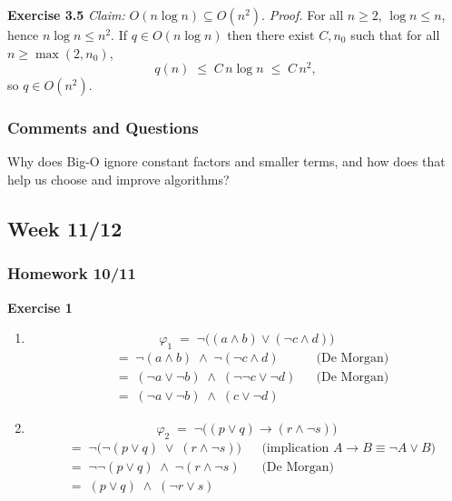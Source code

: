 \documentclass{article}
\theoremstyle{theorem}
\theoremstyle{definition}
\theoremstyle{remark}
\begin{document}
\textbf{Exercise 3.5}  
\emph{Claim:} $O(n\log n)\subseteq O(n^2)$.  
\noindent\emph{Proof.}  
For all $n\ge2$, $\log n\le n$, hence $n\log n\le n^2$. If $q\in O(n\log n)$ then there exist $C,n_0$ such that for all $n\ge\max(2,n_0)$,
\[
  q(n)\;\le\;C\,n\log n\;\le\;C\,n^2,
\]
so $q\in O(n^2)$.


\subsubsection*{Comments and Questions}

Why does Big-O ignore constant factors and smaller terms, and how does that help us choose and improve algorithms?

\subsection{Week 11/12}


\subsubsection*{Homework 10/11}

\textbf{Exercise 1}

\begin{enumerate}
  \item 
    \[
      \varphi_{1} \;=\;\neg\bigl((a\wedge b)\lor(\neg c\wedge d)\bigr)
    \]
    \begin{align*}
      &=\;\neg(a\wedge b)\;\land\;\neg(\neg c\wedge d) 
        &&\text{(De Morgan)}\\
      &=\;(\neg a\lor\neg b)\;\land\;(\neg\neg c\lor\neg d)
        &&\text{(De Morgan)}\\
      &=\;(\neg a\lor\neg b)\;\land\;(c\lor\neg d)
    \end{align*}

  \item 
    \[
      \varphi_{2} \;=\;\neg\bigl((p\lor q)\to(r\wedge\neg s)\bigr)
    \]
    \begin{align*}
      &=\;\neg\bigl(\neg(p\lor q)\;\lor\;(r\wedge\neg s)\bigr)
        &&\text{(implication }A\to B\equiv\neg A\lor B)\\
      &=\;\neg\neg(p\lor q)\;\land\;\neg(r\wedge\neg s)
        &&\text{(De Morgan)}\\
      &=\;(p\lor q)\;\land\;(\neg r\lor s)
    \end{align*}
\end{enumerate}
\end{document}
